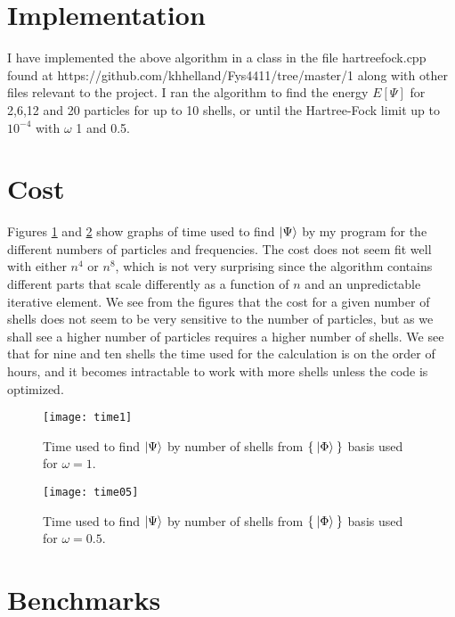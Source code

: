 \documentclass[a4paper,english,12pt]{article}
\begin{document}
\section{Implementation}

I have implemented the above algorithm in a class in the file hartreefock.cpp found at https://github.com/khhelland/Fys4411/tree/master/1 along with
other files relevant to the project. I ran the algorithm to find the energy $E[\Psi]$ for 2,6,12 and 20 particles for up to 10 shells, or
until the Hartree-Fock limit up to $10^{-4}$ with $\omega$ 1 and 0.5. 

\section{Cost}
Figures \ref{figtime1} and \ref{figtime05} show graphs of time used to find $\Ket{\Psi}$ by my program for the different numbers of particles
and frequencies. The cost does not seem fit well with either $n^4$ or $n^8$, which is not very surprising since the algorithm contains different
parts that scale differently as a function of $n$ and an unpredictable iterative element. We see from the figures that the cost for a given
number of shells does not seem to be very sensitive to the number of particles, but as we shall see a higher number of particles requires a
higher number of shells. We see that for nine and ten shells the time used for the calculation is on the order of hours, and it becomes intractable
to work with more shells unless the code is optimized.


\begin{figure}
  \begin{center}
    \texttt{[image: time1]}
  \end{center}
  \caption{Time used to find $\Ket{\Psi}$ by number of shells from \(\Set{\Ket{\Phi}}\) basis used for $\omega=1$.}\label{figtime1}
\end{figure}


\begin{figure}
  \begin{center}
    \texttt{[image: time05]}
  \end{center}
  \caption{Time used to find $\Ket{\Psi}$ by number of shells from \(\Set{\Ket{\Phi}}\) basis used for $\omega=0.5$.}\label{figtime05}
\end{figure}


\section{Benchmarks}
\end{document}
